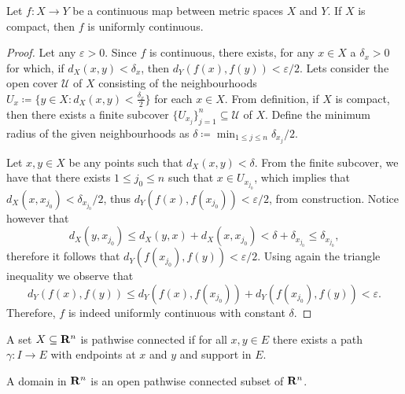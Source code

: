 \begin{theorem}
    \label{thm:heine-cantor}
    Let \(f: X \to Y\) be a continuous map between metric spaces \(X\) and \(Y\). If
    \(X\) is compact, then \(f\) is uniformly continuous.
\end{theorem}

\begin{proof}
    Let any \(\varepsilon > 0\). Since \(f\) is continuous, there exists, for any
    \(x \in X\) a \(\delta_x > 0\) for which, if \(d_X(x, y) < \delta_x\), then
    \(d_Y(f(x), f(y)) < \varepsilon/2\). Lets consider the open cover \(\mathcal U\)
    of \(X\) consisting of the neighbourhoods \(U_x \coloneq \{y \in X \colon d_{X}(x, y)
    < \frac {\delta_{x}} 2\}\) for each \(x \in X\). From definition, if \(X\) is
    compact, then there exists a finite subcover \(\{U_{x_j}\}_{j=1}^n \subseteq
    \mathcal U\) of \(X\). Define the minimum radius of the given neighbourhoods as
    \(\delta \coloneq \min_{1 \leq j \leq n} \delta_{x_j}/2\).

    Let \(x, y \in X\) be any points such that \(d_X(x, y) < \delta\). From the
    finite subcover, we have that there exists \(1 \leq j_0 \leq n\) such that \(x
    \in U_{x_{j_0}}\), which implies that \(d_X(x, x_{j_0}) < \delta_{x_{j_0}}/2\),
    thus \(d_Y(f(x), f(x_{j_0})) < \varepsilon/2\), from construction. Notice however
    that
    \[
        d_X(y, x_{j_0}) \leq d_X(y, x) + d_X(x, x_{j_0})
        < \delta + \delta_{x_{j_0}}
        \leq \delta_{x_{j_0}},
    \]
    therefore it follows that \(d_Y(f(x_{j_0}), f(y)) < \varepsilon/2\). Using again
    the triangle inequality we observe that
    \[
        d_Y(f(x), f(y)) \leq d_Y(f(x), f(x_{j_0})) + d_Y(f(x_{j_0}), f(y))
        < \varepsilon.
    \]
    Therefore, \(f\) is indeed uniformly continuous with constant \(\delta\).
\end{proof}

\begin{definition}\label{def: path-connected}
    A set \(X \subseteq \mathbf{R}^n\) is pathwise connected if for all \(x, y \in E\)
    there exists a path \(\gamma: I \to E\) with endpoints at \(x\) and \(y\) and
    support in \(E\).
\end{definition}

\begin{definition}[Domain]\label{def: domain}
    A domain in \(\mathbf{R}^n\) is an open pathwise connected subset of \(\mathbf{R}^n\).
\end{definition}

